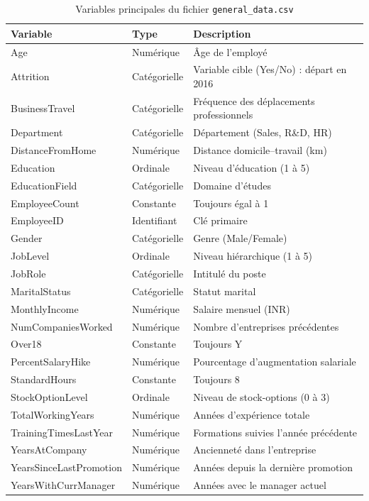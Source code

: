 \begin{table}[htbp]
\centering
\caption{Variables principales du fichier \texttt{general\_data.csv}}
\small
\begin{tabularx}{\textwidth}{l l X}
\toprule
\textbf{Variable} & \textbf{Type} & \textbf{Description} \\
\midrule
Age & Numérique & Âge de l'employé \\
Attrition & Catégorielle & Variable cible (Yes/No) : départ en 2016 \\
BusinessTravel & Catégorielle & Fréquence des déplacements professionnels \\
Department & Catégorielle & Département (Sales, R\&D, HR) \\
DistanceFromHome & Numérique & Distance domicile--travail (km) \\
Education & Ordinale & Niveau d'éducation (1 à 5) \\
EducationField & Catégorielle & Domaine d'études \\
EmployeeCount & Constante & Toujours égal à 1 \\
EmployeeID & Identifiant & Clé primaire \\
Gender & Catégorielle & Genre (Male/Female) \\
JobLevel & Ordinale & Niveau hiérarchique (1 à 5) \\
JobRole & Catégorielle & Intitulé du poste \\
MaritalStatus & Catégorielle & Statut marital \\
MonthlyIncome & Numérique & Salaire mensuel (INR) \\
NumCompaniesWorked & Numérique & Nombre d'entreprises précédentes \\
Over18 & Constante & Toujours Y \\
PercentSalaryHike & Numérique & Pourcentage d'augmentation salariale \\
StandardHours & Constante & Toujours 8 \\
StockOptionLevel & Ordinale & Niveau de stock-options (0 à 3) \\
TotalWorkingYears & Numérique & Années d'expérience totale \\
TrainingTimesLastYear & Numérique & Formations suivies l'année précédente \\
YearsAtCompany & Numérique & Ancienneté dans l'entreprise \\
YearsSinceLastPromotion & Numérique & Années depuis la dernière promotion \\
YearsWithCurrManager & Numérique & Années avec le manager actuel \\
\bottomrule
\end{tabularx}
\end{table}

